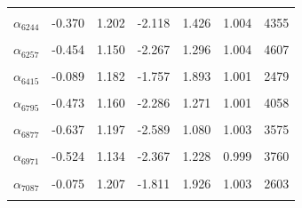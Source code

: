 \begin{longtable}{lrrrrrr}
\cellcolor{gray!10}{$\alpha_{6241}$} & \cellcolor{gray!10}{-0.397} & \cellcolor{gray!10}{1.171} & \cellcolor{gray!10}{-2.240} & \cellcolor{gray!10}{1.400} & \cellcolor{gray!10}{1.002} & \cellcolor{gray!10}{4222}\\
$\alpha_{6244}$ & -0.370 & 1.202 & -2.118 & 1.426 & 1.004 & 4355\\
\cellcolor{gray!10}{$\alpha_{6253}$} & \cellcolor{gray!10}{-0.487} & \cellcolor{gray!10}{1.135} & \cellcolor{gray!10}{-2.308} & \cellcolor{gray!10}{1.257} & \cellcolor{gray!10}{1.000} & \cellcolor{gray!10}{3882}\\
$\alpha_{6257}$ & -0.454 & 1.150 & -2.267 & 1.296 & 1.004 & 4607\\
\cellcolor{gray!10}{$\alpha_{6342}$} & \cellcolor{gray!10}{-0.012} & \cellcolor{gray!10}{1.204} & \cellcolor{gray!10}{-1.686} & \cellcolor{gray!10}{2.020} & \cellcolor{gray!10}{1.000} & \cellcolor{gray!10}{2243}\\
$\alpha_{6415}$ & -0.089 & 1.182 & -1.757 & 1.893 & 1.001 & 2479\\
\cellcolor{gray!10}{$\alpha_{6756}$} & \cellcolor{gray!10}{-0.839} & \cellcolor{gray!10}{1.292} & \cellcolor{gray!10}{-3.011} & \cellcolor{gray!10}{0.979} & \cellcolor{gray!10}{1.002} & \cellcolor{gray!10}{1684}\\
$\alpha_{6795}$ & -0.473 & 1.160 & -2.286 & 1.271 & 1.001 & 4058\\
\cellcolor{gray!10}{$\alpha_{6868}$} & \cellcolor{gray!10}{-0.659} & \cellcolor{gray!10}{1.222} & \cellcolor{gray!10}{-2.640} & \cellcolor{gray!10}{1.082} & \cellcolor{gray!10}{1.000} & \cellcolor{gray!10}{2887}\\
$\alpha_{6877}$ & -0.637 & 1.197 & -2.589 & 1.080 & 1.003 & 3575\\
\cellcolor{gray!10}{$\alpha_{6957}$} & \cellcolor{gray!10}{-0.396} & \cellcolor{gray!10}{1.176} & \cellcolor{gray!10}{-2.206} & \cellcolor{gray!10}{1.401} & \cellcolor{gray!10}{1.003} & \cellcolor{gray!10}{4755}\\
$\alpha_{6971}$ & -0.524 & 1.134 & -2.367 & 1.228 & 0.999 & 3760\\
\cellcolor{gray!10}{$\alpha_{6973}$} & \cellcolor{gray!10}{-0.609} & \cellcolor{gray!10}{1.133} & \cellcolor{gray!10}{-2.430} & \cellcolor{gray!10}{1.071} & \cellcolor{gray!10}{1.001} & \cellcolor{gray!10}{3607}\\
$\alpha_{7087}$ & -0.075 & 1.207 & -1.811 & 1.926 & 1.003 & 2603\\
\cellcolor{gray!10}{$\alpha_{7163}$} & \cellcolor{gray!10}{-0.561} & \cellcolor{gray!10}{1.134} & \cellcolor{gray!10}{-2.404} & \cellcolor{gray!10}{1.114} & \cellcolor{gray!10}{1.003} & \cellcolor{gray!10}{3804}\\

\end{longtable}
